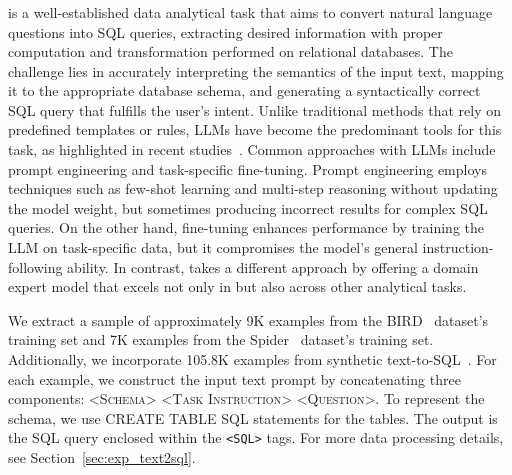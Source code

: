 \vspace{-1mm}
\subsubsection{\texttosql}

\texttosql is a well-established data analytical task that aims to convert natural language questions into SQL queries, extracting desired information with proper computation and transformation performed on relational databases. The challenge lies in accurately interpreting the semantics of the input text, mapping it to the appropriate database schema, and generating a syntactically correct SQL query that fulfills the user's intent. 
Unlike traditional methods that rely on predefined templates or rules\citep{li2014constructing}, LLMs have become the predominant tools for this task, as highlighted in recent studies~\citep{gao2024xiyan, pourreza2024chase, talaei2024chess}. Common approaches with LLMs include prompt engineering and task-specific fine-tuning. 
Prompt engineering employs techniques such as few-shot learning and multi-step reasoning without updating the model weight, but sometimes producing incorrect results for complex SQL queries. On the other hand, fine-tuning enhances performance by training the LLM on task-specific data, but it compromises the model's general instruction-following ability. In contrast, \modelname takes a different approach by offering a domain expert model that excels not only in \texttosql but also across other analytical tasks.

We extract a sample of approximately 9K examples from the BIRD~\citep{bird} dataset's training set and 7K examples from the Spider~\citep{yu-etal-2018-spider} dataset's training set. Additionally, we incorporate 105.8K examples from synthetic text-to-SQL~\citep{gretel-synthetic-text-to-sql-2024}.
For each example, we construct the input text prompt by concatenating three components: \textsc{<Schema> <Task Instruction> <Question>}. To represent the schema, we use \textsc{CREATE TABLE} SQL statements for the tables. The output is the SQL query enclosed within the \texttt{<SQL>} tags. For more data processing details, see Section~\ref{sec:exp_text2sql}.
